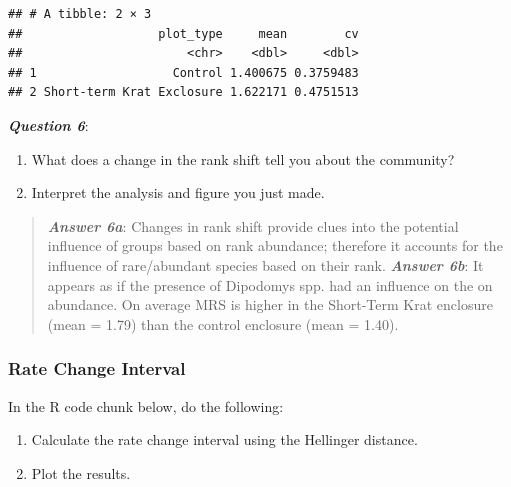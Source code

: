 \documentclass[]{article}
\newenvironment{Shaded}{\begin{snugshade}}{\end{snugshade}}
\newcommand{\KeywordTok}[1]{\textcolor[rgb]{0.13,0.29,0.53}{\textbf{{#1}}}}
\newcommand{\DataTypeTok}[1]{\textcolor[rgb]{0.13,0.29,0.53}{{#1}}}
\newcommand{\StringTok}[1]{\textcolor[rgb]{0.31,0.60,0.02}{{#1}}}
\newcommand{\NormalTok}[1]{{#1}}
\providecommand{\tightlist}{%
  \setlength{\itemsep}{0pt}\setlength{\parskip}{0pt}}
\begin{document}
\begin{Shaded}
\end{Shaded}

\begin{verbatim}
## # A tibble: 2 × 3
##                   plot_type     mean        cv
##                       <chr>    <dbl>     <dbl>
## 1                   Control 1.400675 0.3759483
## 2 Short-term Krat Exclosure 1.622171 0.4751513
\end{verbatim}

\textbf{\emph{Question 6}}:

\begin{enumerate}
\def\labelenumi{\alph{enumi}.}
\tightlist
\item
  What does a change in the rank shift tell you about the community?
\item
  Interpret the analysis and figure you just made.
\end{enumerate}

\begin{quote}
\textbf{\emph{Answer 6a}}: Changes in rank shift provide clues into the
potential influence of groups based on rank abundance; therefore it
accounts for the influence of rare/abundant species based on their rank.
\textbf{\emph{Answer 6b}}: It appears as if the presence of Dipodomys
spp. had an influence on the on abundance. On average MRS is higher in
the Short-Term Krat enclosure (mean = 1.79) than the control enclosure
(mean = 1.40).
\end{quote}

\subsubsection{Rate Change Interval}\label{rate-change-interval}

In the R code chunk below, do the following:

\begin{enumerate}
\def\labelenumi{\arabic{enumi}.}
\tightlist
\item
  Calculate the rate change interval using the Hellinger distance.
\item
  Plot the results.
\end{enumerate}
\end{document}
